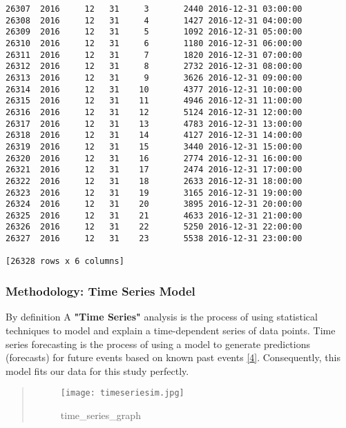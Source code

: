 \documentclass[11pt]{article}
\makeatletter
\def\maxwidth{\ifdim\Gin@nat@width>\linewidth\linewidth
    \else\Gin@nat@width\fi}
\let\Oldincludegraphics\includegraphics
\renewcommand{\includegraphics}[1]{\Oldincludegraphics[width=.8\maxwidth]{#1}}
\makeatother
\begin{document}
\begin{Verbatim}[commandchars=\\\{\}]
26307  2016     12   31     3       2440 2016-12-31 03:00:00
26308  2016     12   31     4       1427 2016-12-31 04:00:00
26309  2016     12   31     5       1092 2016-12-31 05:00:00
26310  2016     12   31     6       1180 2016-12-31 06:00:00
26311  2016     12   31     7       1820 2016-12-31 07:00:00
26312  2016     12   31     8       2732 2016-12-31 08:00:00
26313  2016     12   31     9       3626 2016-12-31 09:00:00
26314  2016     12   31    10       4377 2016-12-31 10:00:00
26315  2016     12   31    11       4946 2016-12-31 11:00:00
26316  2016     12   31    12       5124 2016-12-31 12:00:00
26317  2016     12   31    13       4783 2016-12-31 13:00:00
26318  2016     12   31    14       4127 2016-12-31 14:00:00
26319  2016     12   31    15       3440 2016-12-31 15:00:00
26320  2016     12   31    16       2774 2016-12-31 16:00:00
26321  2016     12   31    17       2474 2016-12-31 17:00:00
26322  2016     12   31    18       2633 2016-12-31 18:00:00
26323  2016     12   31    19       3165 2016-12-31 19:00:00
26324  2016     12   31    20       3895 2016-12-31 20:00:00
26325  2016     12   31    21       4633 2016-12-31 21:00:00
26326  2016     12   31    22       5250 2016-12-31 22:00:00
26327  2016     12   31    23       5538 2016-12-31 23:00:00

[26328 rows x 6 columns]

    \end{Verbatim}

    \subsubsection{Methodology: Time Series
Model}\label{methodology-time-series-model}

By definition A \textbf{"Time Series"} analysis is the process of using
statistical techniques to model and explain a time-dependent series of
data points. Time series forecasting is the process of using a model to
generate predictions (forecasts) for future events based on known past
events
\href{https://wiki.pentaho.com/display/DATAMINING/Time+Series+Analysis+and+Forecasting+with+Weka\#TimeSeriesAnalysisandForecastingwithWeka-1Introduction}{{[}4{]}}.
Consequently, this model fits our data for this study perfectly.

\begin{quote}
\begin{figure}
\centering
\texttt{[image: timeseriesim.jpg]}
\caption{time\_series\_graph}
\end{figure}
\end{quote}
\end{document}
